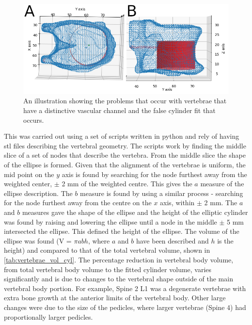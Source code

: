 \begin{figure}[ht!]
  \centering
 
\includegraphics[width=5in]{Chapters/Chapter_HT_images/cyl_fit_channel_both.png}
  \caption{An illustration showing the problems that occur with vertebrae that
have a distinctive vascular channel and the false cylinder fit that occurs.}
  \label{fig:cyl_channel}
\end{figure}

This was carried out using a set of scripts written in python and rely of
having stl files describing the vertebral geometry.
The scripts work by finding the middle slice of a set of nodes that describe
the vertebra.
From the middle slice the shape of the ellipse is formed.
Given that the alignment of the vertebrae is uniform, the mid point on the $y$
axis is found by searching for the node furthest away from the weighted center,
$\pm$ 2 mm of the weighted centre.
This gives the $a$ measure of the ellipse description.
The $b$ measure is found by using a similar process - searching for the node
furthest away from the centre on the $x$ axis, within $\pm$ 2 mm.
The $a$ and $b$ measures gave the shape of the ellipse and the height of the
elliptic cylinder was found by raising and lowering the ellipse until a node in
the middle $\pm$ 5 mm intersected the ellipse.
This defined the height of the ellipse.
The volume of the ellipse was found (V = $\pi a b h$, where $a$ and $b$ have
been described and $h$ is the height) and compared to that of the total
vertebral volume, shown in \cref{tab:vertebrae_vol_cyl}.
The percentage reduction in vertebral body volume, from total vertebral body
volume to the fitted cylinder volume, varies significantly and is due to
changes to the vertebral shape outside of the main vertebral body portion.
For example, Spine 2 L1 was a degenerate vertebrae with extra bone growth at
the anterior limits of the vertebral body.
Other large changes were due to the size of the pedicles, where larger
vertebrae (Spine 4) had proportionally larger pedicles.

